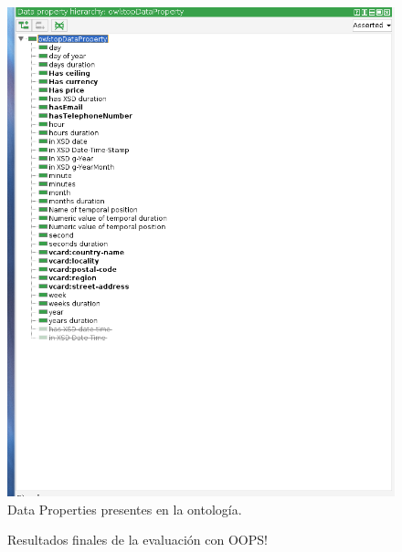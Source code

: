 \documentclass[a4paper,12pt]{article}
\begin{document}
	\begin{figure}[H]
		\centering
		\includegraphics[width=\textwidth]{include/data.png}
		\caption{Data Properties presentes en la ontología.}
	\end{figure}
	
	\begin{figure}[H]
		\centering
		\caption{Resultados finales de la evaluación con OOPS!}
	\end{figure}
\end{document}
